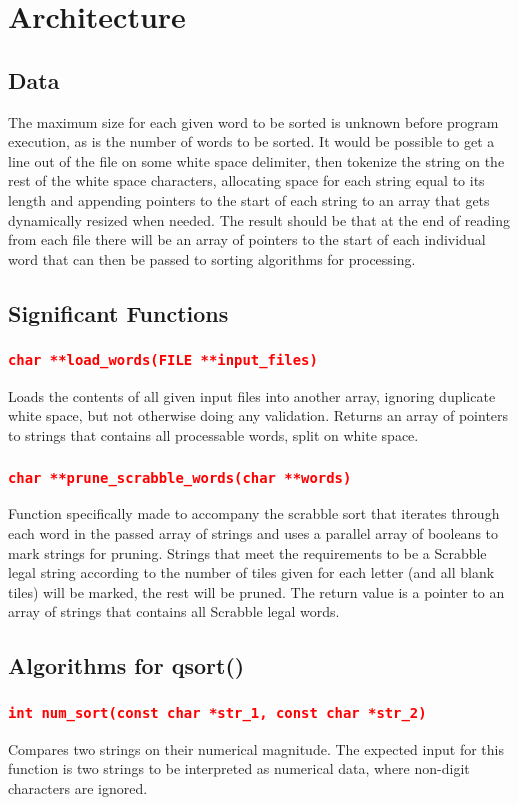 \documentclass[11pt]{report}
\begin{document}
\section*{Architecture}
\subsection*{Data}
The maximum size for each given word to be sorted is unknown before program execution, as is the number of words to be sorted. It would be possible to get a line out of the file on some white space delimiter, then tokenize the string on the rest of the white space characters, allocating space for each string equal to its length and appending pointers to the start of each string to an array that gets dynamically resized when needed. The result should be that at the end of reading from each file there will be an array of pointers to the start of each individual word that can then be passed to sorting algorithms for processing.
\subsection*{Significant Functions}
\subsubsection*{\texttt{\textcolor{red}{char **load\_words(FILE **input\_files)}}}
Loads the contents of all given input files into another array, ignoring duplicate white space, but not otherwise doing any validation. Returns an array of pointers to strings that contains all processable words, split on white space.
\subsubsection*{\texttt{\textcolor{red}{char **prune\_scrabble\_words(char **words)}}}
Function specifically made to accompany the scrabble sort that iterates through each word in the passed array of strings and uses a parallel array of booleans to mark strings for pruning. Strings that meet the requirements to be a Scrabble legal string according to the number of tiles given for each letter (and all blank tiles) will be marked, the rest will be pruned. The return value is a pointer to an array of strings that contains all Scrabble legal words.
\subsection*{Algorithms for qsort()}
\subsubsection*{\texttt{\textcolor{red}{int num\_sort(const char *str\_1, const char *str\_2)}}}
Compares two strings on their numerical magnitude. The expected input for this function is two strings to be interpreted as numerical data, where non-digit characters are ignored.
\end{document}
